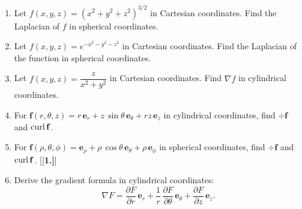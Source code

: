 \centerline{}\label{sec4dot7}
\begin{enumerate}[\bfseries 1.]
 \item Let $f(x,y,z)=(x^2 + y^2 + z^2 )^{3/2}$ in Cartesian coordinates.
 Find the Laplacian of $f$ in spherical coordinates.
 \item Let $f(x,y,z)=e^{-x^2 - y^2 -z^2}$ in Cartesian coordinates.
 Find the Laplacian of the function in spherical coordinates.
 \item Let $f(x,y,z) = \dfrac{z}{x^2 + y^2}$ in Cartesian coordinates. Find $\nabla f$ in cylindrical coordinates.
 \item For $\mathbf{f}(r,\theta,z) = r\,\mathbf{e}_{r} + z\,\sin\theta\,\mathbf{e}_{\theta} + rz\,\mathbf{e}_{z}$ in
  cylindrical coordinates, find $\div\mathbf{f}$ and $\mathop{\mathrm{curl}}\nolimits\mathbf{f}$.
 \item For $\mathbf{f}(\rho,\theta,\phi) = \mathbf{e}_{\rho} + \rho\,\cos\theta\,\mathbf{e}_{\theta} +
  \rho\,\mathbf{e}_{\phi}$ in spherical coordinates, find $\div\mathbf{f}$ and $\mathop{\mathrm{curl}}\nolimits\mathbf{f}$.
[{[\bfseries 1.]}]
 \item Derive the gradient formula in cylindrical coordinates: \[\nabla F =
  \frac{\partial F}{\partial r}\,\mathbf{e}_{r} +
  \frac{1}{r}\,\frac{\partial F}{\partial \theta}\,\mathbf{e}_{\theta}+\frac{\partial F}{\partial z}\,\mathbf{e}_{z}.\]
\end{enumerate}
